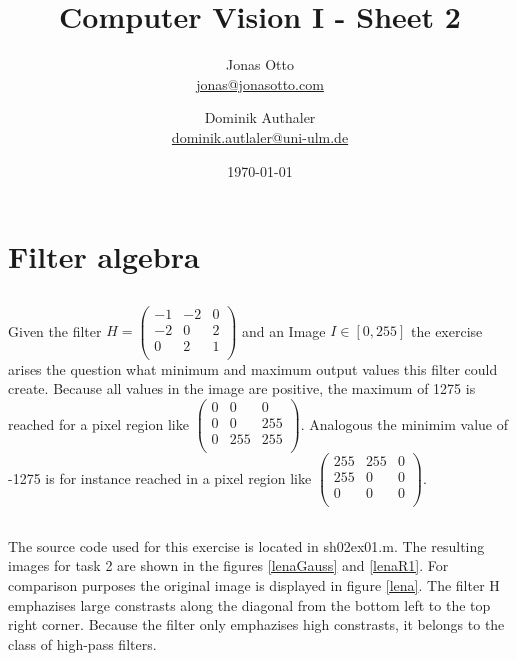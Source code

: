 \documentclass{article}
\title{Computer Vision I - Sheet 2}
\author{ Jonas Otto\\ \href{mailto:jonas@jonasotto.com}{jonas@jonasotto.com} \and Dominik Authaler \\ 
\href{mailto:dominik.autaler@uni-ulm.de}{dominik.autlaler@uni-ulm.de}
}
\date{\today}
\begin{document}
\maketitle

\newpage

\section{Filter algebra}

\subsection{}
Given the filter $H = \left(\begin{array}{rrr}-1 & -2 & 0\\-2 & 0 & 2\\0 & 2 & 1\\\end{array}\right)$ and an Image $I \in [0, 255]$ the exercise arises the question what minimum and maximum output values this filter could create. Because all values in the image are positive, the maximum of 1275 is reached for a pixel region like $\left(\begin{array}{rrr}0 & 0 & 0\\0 & 0 & 255\\0 & 255 & 255\\\end{array}\right) $. Analogous the minimim value of -1275 is for instance reached in a pixel region like $\left(\begin{array}{rrr}255 & 255 & 0\\255 & 0 & 0\\0 & 0 & 0\\\end{array}\right)$.

\subsection{}
The source code used for this exercise is located in sh02ex01.m. The resulting images for task 2 are shown in the figures \ref{lenaGauss} and \ref{lenaR1}. For comparison purposes the original image is displayed in figure \ref{lena}. The filter H emphazises large constrasts along the diagonal from the bottom left to the top right corner. Because the filter only emphazises high constrasts, it belongs to the class of high-pass filters.
 
\end{document}
